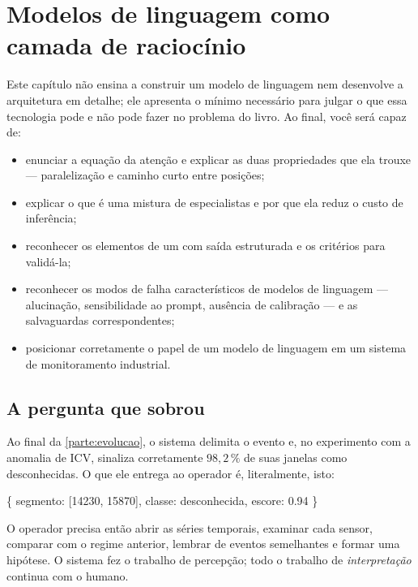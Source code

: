 \chapter{Modelos de linguagem como camada de raciocínio}
\label{cap:llm}

\begin{objetivos}
Este capítulo não ensina a construir um modelo de linguagem nem desenvolve a
arquitetura  em detalhe; ele apresenta o mínimo necessário para
julgar o que essa tecnologia pode e não pode fazer no problema do livro. Ao final,
você será capaz de:
\begin{itemize}[leftmargin=*,itemsep=0.2em]
  \item enunciar a equação da atenção e explicar as duas propriedades que ela trouxe ---
        paralelização e caminho curto entre posições;
  \item explicar o que é uma mistura de especialistas e por que ela reduz o custo de
        inferência;
  \item reconhecer os elementos de um  com saída estruturada e os critérios
        para validá-la;
  \item reconhecer os modos de falha característicos de modelos de linguagem ---
        alucinação, sensibilidade ao prompt, ausência de calibração --- e as
        salvaguardas correspondentes;
  \item posicionar corretamente o papel de um modelo de linguagem em um sistema de
        monitoramento industrial.
\end{itemize}
\end{objetivos}

\section{A pergunta que sobrou}

Ao final da \cref{parte:evolucao}, o sistema delimita o evento e, no experimento com a
anomalia de ICV, sinaliza corretamente $98{,}2\,\%$ de suas janelas como desconhecidas.
O que ele entrega ao operador é, literalmente, isto:

\begin{center}
\ttfamily
\{ segmento: [14230, 15870], classe: desconhecida, escore: 0.94 \}
\end{center}

O operador precisa então abrir as séries temporais, examinar cada sensor, comparar com o
regime anterior, lembrar de eventos semelhantes e formar uma hipótese. O sistema fez o
trabalho de percepção; todo o trabalho de \emph{interpretação} continua com o humano.

